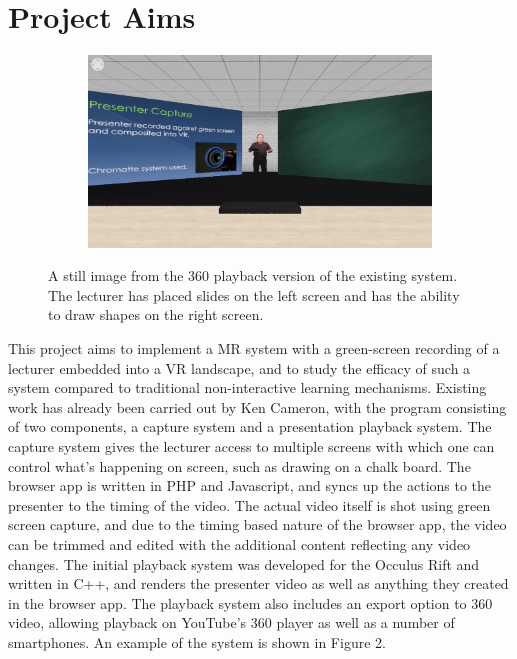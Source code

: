 \documentclass[11pt]{report}
\begin{document}
\section{Project Aims}
\begin{figure}
\centering
\begin{subfigure}[b]{0.7\textwidth}  
\includegraphics[width=\textwidth]{MRpresentation.png}
\end{subfigure}
\caption{A still image from the 360 playback version of the existing system. The lecturer has placed slides on the left screen and has the ability to draw shapes on the right screen.}
\end{figure}
This project aims to implement a MR system with a green-screen recording of a lecturer embedded into a VR landscape, and to study the efficacy of such a system compared to traditional non-interactive learning mechanisms. Existing work has already been carried out by Ken Cameron, with the program consisting of two components, a capture system and a presentation playback system. The capture system gives the lecturer access to multiple screens with which one can control what's happening on screen, such as drawing on a chalk board. The browser app is written in PHP and Javascript, and syncs up the actions to the presenter to the timing of the video. The actual video itself is shot using green screen capture, and due to the timing based nature of the browser app, the video can be trimmed and edited with the additional content reflecting any video changes. The initial playback system was developed for the Occulus Rift and written in C++, and renders the presenter video as well as anything they created in the browser app. The playback system also includes an export option to 360 video, allowing playback on YouTube's 360 player as well as a number of smartphones. An example of the system is shown in Figure 2.\\~\\
\end{document}
